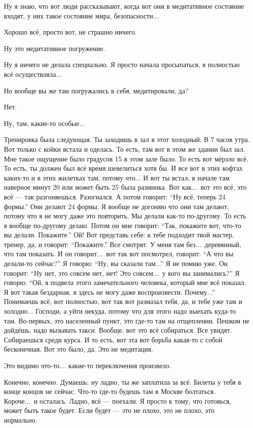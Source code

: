 \I
Ну я знаю, что вот люди рассказывают, когда вот они в
медитативное состояние входят,
у них такое состояние мира, безопасности...

\M
Хорошо всё, просто вот, не страшно ничего.

\I
Ну это медитативное погружение.

\M
Ну я ничего не делала специально. Я просто начала просыпаться, я полностью всё осуществляла...

\I
Но вообще вы же там погружались в себя, медитировали, да?

\M
Нет.

\I
Ну, там, какие-то особые...

\M
Тренировка была следующая. Ты заходишь
в зал в
этот холодный.
В 7 часов утра.
Вот только с койки встала и оделась.
То есть, там вот в этом же здании был зал.
Мне такое ощущение было градусов 15 в этом зале было.
То есть вот мёрзло всё.
То есть, ты должен был всё время шевелиться хотя бы.
И все вот в этих кофтах каких-то и в этих жилетках там,
потому что... И вот ты встал, в начале там наверное минут 20 или может быть 25 была разминка.
Вот как...\ вот это всё, это всё --- так разгоняешься.
Разогнался. А потом говорит: ``Ну всё, теперь 24 формы.''
Они делают 24 формы. Я вообще не догоняю что они там делают,
потому что я не могу даже это повторить. Мы делали как-то по-другому.
То есть я вообще по-другому делаю.
Потом он мне говорит: ``Так, покажите вот, что-то вы делали. Покажите.''
Ой! Вот представь себе: к тебе подходит твой мастер, тренер, да, и говорит:
``Покажите.''
Все смотрят.
У меня там без...\ деревянный, что там показать.
И он говорит...\ вот так вот посмотрел, говорит: ``А что вы делали-то сейчас?''
Я говорю: ``Ну, вы сказали там...'' Я не помню уже.
Он говорит: ``Ну нет, это совсем нет, нет! Это совсем...\ у кого вы занимались?''
Я говорю: ``Ой, я подвела этого замечательного человека, который мне всё показал.
Я вот такая бездарная, я здесь не могу даже воспроизвести. Почему...''
Понимаешь всё, вот полностью, вот так вот размазал тебя, да, и тебе уже там и холодно...
Господи, а уйти некуда, потому что для этого надо выехать куда-то там.
Во-первых, это населенный пункт, это где-то там на отщеплении.
Пешком не дойдёшь, надо вызывать такси. Вообще, вот это всё собираться. Все увидят.
Собираешься среди курса. И то есть, вот эта вот борьба какая-то с собой бесконечная.
Вот это было, да. Это не медитация.

\I
Это видимо что-то...\ какие-то переключения произвело.

\M
Конечно, конечно.
Думаешь: ну ладно, ты же заплатила за всё.
Билеты у тебя в конце концов не сейчас.
Что-то где-то будешь там в Москве болтаться.
Короче...\ и осталась.
Ладно, всё --- поехали.
Я просто к тому, что готовься, может быть такое будет.
Если будет --- это не плохо, это не плохо, это нормально.

